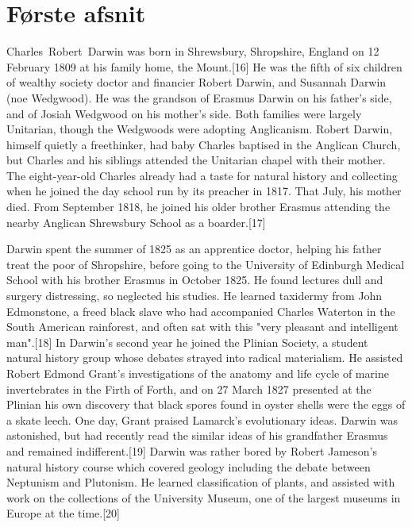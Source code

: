 \documentclass{article}%
\begin{document}
\section{Første afsnit}

\begin{multicols}{2}%
\mbox{Charles Robert Darwin} %
was born in Shrewsbury, Shropshire, England on 12 February 1809 at his family home, the Mount.[16] He was the fifth of six children of wealthy society doctor and financier Robert Darwin, and Susannah Darwin (noe Wedgwood). He was the grandson of Erasmus Darwin on his father's side, and of Josiah Wedgwood on his mother's side. Both families were largely Unitarian, though the Wedgwoods were adopting Anglicanism. Robert Darwin, himself quietly a freethinker, had baby Charles baptised in the Anglican Church, but Charles and his siblings attended the Unitarian chapel with their mother. The eight-year-old Charles already had a taste for natural history and collecting when he joined the day school run by its preacher in 1817. That July, his mother died. From September 1818, he joined his older brother Erasmus attending the nearby Anglican Shrewsbury School as a boarder.[17]
\end{multicols}

\begin{multicols}{3}%
Darwin spent the summer of 1825 as an apprentice doctor, helping his father treat the poor of Shropshire, before going to the University of Edinburgh Medical School with his brother Erasmus in October 1825. He found lectures dull and surgery distressing, so neglected his studies. He learned taxidermy from John Edmonstone, a freed black slave who had accompanied Charles Waterton in the South American rainforest, and often sat with this "very pleasant and intelligent man".[18]
In Darwin's second year he joined the Plinian Society, a student natural history group whose debates strayed into radical materialism. He assisted Robert Edmond Grant's investigations of the anatomy and life cycle of marine invertebrates in the Firth of Forth, and on 27 March 1827 presented at the Plinian his own discovery that black spores found in oyster shells were the eggs of a skate leech. One day, Grant praised Lamarck's evolutionary ideas. Darwin was astonished, but had recently read the similar ideas of his grandfather Erasmus and remained indifferent.[19] Darwin was rather bored by Robert Jameson's natural history course which covered geology including the debate between Neptunism and Plutonism. He learned classification of plants, and assisted with work on the collections of the University Museum, one of the largest museums in Europe at the time.[20]
\end{multicols}
\end{document}
